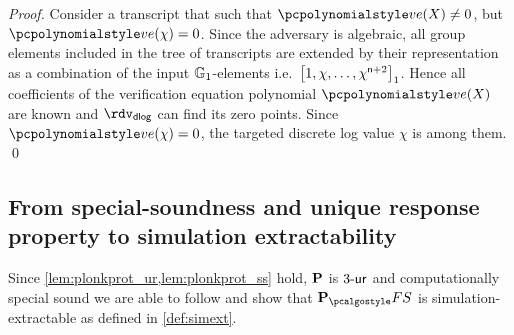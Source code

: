 \documentclass[runningheads,11pt]{llncs}
\theoremstyle{definition}
\begin{document}
\begin{proof}
	 Consider a transcript that such that
	$\vereq(X) \neq 0$, but $\vereq(\chi) = 0$.
	Since the adversary is algebraic, all group elements included in the tree of
  transcripts are extended by their representation as a combination of the input
  $\mathbb{G}_1$-elements i.e.~$\left[1, \chi, \ldots, \chi^{\mathsf{n} +
      2}\right]_{1}$. Hence all coefficients of the verification equation polynomial
  $\vereq(X)$ are known and $\rdvdlog$ can find its zero points. Since
  $\vereq(\chi) = 0$, the targeted discrete log value $\chi$ is among them.
	\qed
\end{proof}

\subsection{From special-soundness and unique response property to simulation extractability}

Since \cref{lem:plonkprot_ur,lem:plonkprot_ss} hold, $\mathbf{P}$ is ${3\text{-}\mathsf{ur}}$ and computationally special sound we are able to follow \cite{INDOCRYPT:FKMV12} and show that $\plonkprot_\fs$ is simulation-extractable as defined in \cref{def:simext}.
\end{document}
